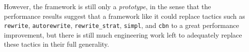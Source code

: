 \documentclass[twoside]{article}
\begin{document}
However, the framework is still only a \emph{prototype}, in the sense that the performance results suggest that a framework like it could replace tactics such as \texttt{rewrite}, \texttt{autorewrite}, \texttt{rewrite\_strat}, \texttt{simpl}, and \texttt{cbn} to a great performance improvement, but there is still much engineering work left to adequately replace these tactics in their full generality.

%
\printbibliography[title=References]
\end{document}
